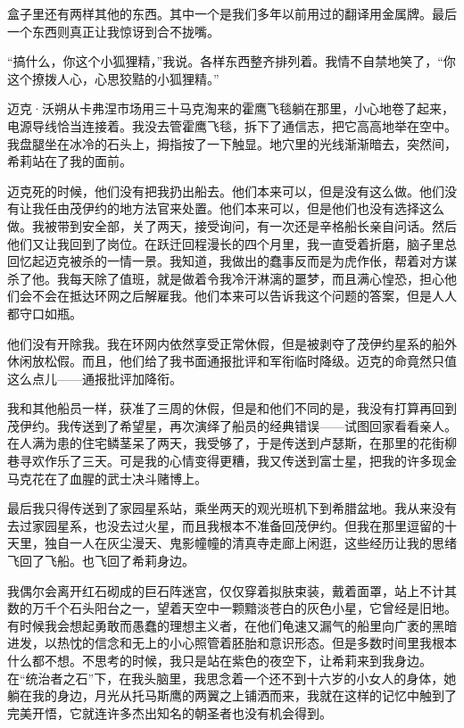 \documentclass[AutoFakeBold=true]{book}
\begin{document}
盒子里还有两样其他的东西。其中一个是我们多年以前用过的翻译用金属牌。最后一个东西则真正让我惊讶到合不拢嘴。

``搞什么，你这个小狐狸精，''我说。各样东西整齐排列着。我情不自禁地笑了，``你这个撩拨人心，心思狡黠的小狐狸精。''

迈克·沃朔从卡弗涅市场用三十马克淘来的霍鹰飞毯躺在那里，小心地卷了起来，电源导线恰当连接着。我没去管霍鹰飞毯，拆下了通信志，把它高高地举在空中。我盘腿坐在冰冷的石头上，拇指按了一下触显。地穴里的光线渐渐暗去，突然间，希莉站在了我的面前。

\vspace*{1em}

迈克死的时候，他们没有把我扔出船去。他们本来可以，但是没有这么做。他们没有让我任由茂伊约的地方法官来处置。他们本来可以，但是他们也没有选择这么做。我被带到安全部，关了两天，接受询问，有一次还是辛格船长亲自问话。然后他们又让我回到了岗位。在跃迁回程漫长的四个月里，我一直受着折磨，脑子里总回忆起迈克被杀的一情一景。我知道，我做出的蠢事反而是为虎作伥，帮着对方谋杀了他。我每天除了值班，就是做着令我冷汗淋漓的噩梦，而且满心惶恐，担心他们会不会在抵达环网之后解雇我。他们本来可以告诉我这个问题的答案，但是人人都守口如瓶。

他们没有开除我。我在环网内依然享受正常休假，但是被剥夺了茂伊约星系的船外休闲放松假。而且，他们给了我书面通报批评和军衔临时降级。迈克的命竟然只值这么点儿——通报批评加降衔。

我和其他船员一样，获准了三周的休假，但是和他们不同的是，我没有打算再回到茂伊约。我传送到了希望星，再次演绎了船员的经典错误——试图回家看看亲人。在人满为患的住宅鳞茎呆了两天，我受够了，于是传送到卢瑟斯，在那里的花街柳巷寻欢作乐了三天。可是我的心情变得更糟，我又传送到富士星，把我的许多现金马克花在了血腥的武士决斗赌博上。

最后我只得传送到了家园星系站，乘坐两天的观光班机下到希腊盆地。我从来没有去过家园星系，也没去过火星，而且我根本不准备回茂伊约。但我在那里逗留的十天里，独自一人在灰尘漫天、鬼影幢幢的清真寺走廊上闲逛，这些经历让我的思绪飞回了飞船。也飞回了希莉身边。

我偶尔会离开红石砌成的巨石阵迷宫，仅仅穿着拟肤束装，戴着面罩，站上不计其数的万千个石头阳台之一，望着天空中一颗黯淡苍白的灰色小星，它曾经是旧地。有时候我会想起勇敢而愚蠢的理想主义者，在他们龟速又漏气的船里向广袤的黑暗进发，以热忱的信念和无上的小心照管着胚胎和意识形态。但是多数时间里我根本什么都不想。不思考的时候，我只是站在紫色的夜空下，让希莉来到我身边。在``统治者之石''下，在我头脑里，我思念着一个还不到十六岁的小女人的身体，她躺在我的身边，月光从托马斯鹰的两翼之上铺洒而来，我就在这样的记忆中触到了完美开悟，它就连许多杰出知名的朝圣者也没有机会得到。
\end{document}
